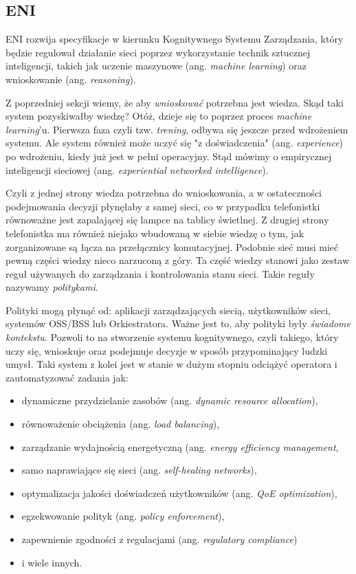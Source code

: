 \subsection{ENI}

ENI rozwija specyfikacje w kierunku Kognitywnego Systemu Zarządzania, który będzie regulował działanie sieci poprzez wykorzystanie technik sztucznej inteligencji, takich jak uczenie maszynowe (ang. \textit{machine learning}) oraz wnioskowanie (ang. \textit{reasoning}). 

Z poprzedniej sekcji wiemy, że aby \textit{wnioskować} potrzebna jest wiedza. Skąd taki system pozyskiwałby wiedzę? Otóż, dzieje się to poprzez proces \textit{machine learning}'u. Pierwsza faza czyli tzw. \textit{trening}, odbywa się jeszcze przed wdrożeniem systemu. Ale system również może uczyć się "z doświadczenia" (ang. \textit{experience}) po wdrożeniu, kiedy już jest w pełni operacyjny. Stąd mówimy o empirycznej inteligencji sieciowej (ang. \textit{experiential networked intelligence}). 

Czyli z jednej strony wiedza potrzebna do wnioskowania, a w ostateczności podejmowania decyzji płynęłaby z samej sieci, co w przypadku telefonistki równoważne jest zapalającej się lampce na tablicy świetlnej. Z drugiej strony telefonistka ma również niejako wbudowaną w siebie wiedzę o tym, jak zorganizowane są łącza na przełącznicy komutacyjnej. Podobnie sieć musi mieć pewną części wiedzy nieco narzuconą z góry. Ta część wiedzy stanowi jako zestaw reguł używanych do zarządzania i kontrolowania stanu sieci. Takie reguły nazywamy \textit{politykami}.

Polityki mogą płynąć od: aplikacji zarządzających siecią, użytkowników sieci, systemów OSS/BSS lub Orkiestratora. Ważne jest to, aby polityki były \textit{świadome kontekstu}. Pozwoli to na stworzenie systemu kognitywnego, czyli takiego, który uczy się, wnioskuje oraz podejmuje decyzje w sposób przypominający ludzki umysł. Taki system z kolei jest w stanie w dużym stopniu odciążyć operatora i zautomatyzować zadania jak: 
\begin{itemize}
    \item dynamiczne przydzielanie zasobów (ang. \textit{dynamic resource allocation}), 
    \item równoważenie obciążenia (ang. \textit{load balancing}), 
    \item zarządzanie wydajnością energetyczną (ang. \textit{energy efficiency management}, 
    \item samo naprawiające się sieci (ang. \textit{self-healing networks}), 
    \item optymalizacja jakości doświadczeń użytkowników (ang. \textit{QoE optimization}), 
    \item egzekwowanie polityk (ang. \textit{policy enforcement}), 
    \item zapewnienie zgodności z regulacjami (ang. \textit{regulatory compliance}) 
    \item i wiele innych.
\end{itemize}

